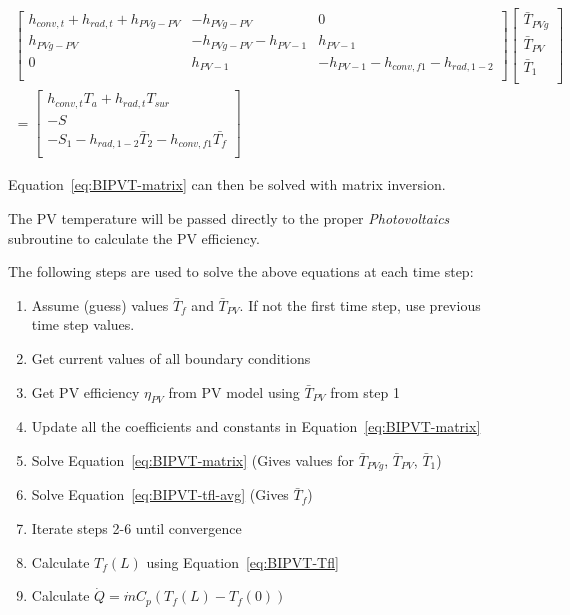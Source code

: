 {\begin{equation}
\begin{split}
\left[\begin{matrix}h_{conv,t}+h_{rad,t}+h_{PVg-PV}&-h_{PVg-PV}&0\\h_{PVg-PV}&-h_{PVg-PV}-h_{PV-1}&h_{PV-1}\\0&h_{PV-1}&-h_{PV-1}-h_{conv,f1}-h_{rad,1-2}\\\end{matrix}\right]\left[\begin{matrix}{\bar{T}}_{PVg}\\{\bar{T}}_{PV}\\{\bar{T}}_1\\\end{matrix}\right] \\ 
=\left[\begin{matrix}h_{conv,t}T_a+h_{rad,t}T_{sur}\\-S\\-S_1-h_{rad,1-2}{\bar{T}}_2-h_{conv,f1}\bar{T_f}\\\end{matrix}\right]
\end{split}
\label{eq:BIPVT-matrix}
\end{equation}

Equation~\ref{eq:BIPVT-matrix} can then be solved with matrix inversion.

The PV temperature will be passed directly to the proper \emph{Photovoltaics} subroutine to calculate the PV efficiency.

The following steps are used to solve the above equations at each time step:

\begin{enumerate}
	\item Assume (guess) values \(\bar{T}_{f}\) and \(\bar{T}_{PV}\). If not the first time step, use previous time step values.
	\item Get current values of all boundary conditions
	\item Get PV efficiency \(\eta_{PV}\) from PV model using \(\bar{T}_{PV}\) from step 1
	\item Update all the coefficients and constants in Equation~\ref{eq:BIPVT-matrix}
	\item Solve Equation~\ref{eq:BIPVT-matrix} (Gives values for \(\bar{T}_{PVg}\), \(\bar{T}_{PV}\), \(\bar{T}_{1}\))
	\item Solve Equation~\ref{eq:BIPVT-tfl-avg} (Gives \(\bar{T}_{f}\))
	\item Iterate steps 2-6 until convergence
	\item Calculate \(T_{f}(L)\) using Equation~\ref{eq:BIPVT-Tfl}
	\item Calculate \(\dot{Q}=\dot{m}C_{p}\left(T_{f}(L)-T_{f}(0)\right)\)
\end{enumerate}

}
